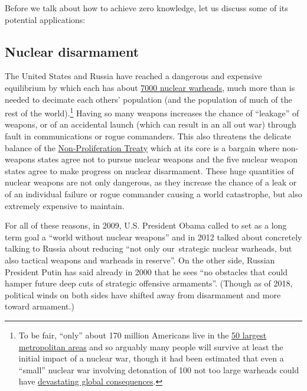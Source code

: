 Before we talk about how to achieve zero knowledge, let us discuss some
of its potential applications:

\subsection{Nuclear disarmament}\label{Nuclear-disarmament}

The United States and Russia have reached a dangerous and expensive
equilibrium by which each has about
\href{https://www.armscontrol.org/factsheets/Nuclearweaponswhohaswhat}{7000
nuclear warheads}, much more than is needed to decimate each others'
population (and the population of much of the rest of the
world).\footnote{To be fair, ``only'' about 170 million Americans live
  in the
  \href{https://www.currentresults.com/Weather-Extremes/US/largest-cities-list.php}{50
  largest metropolitan areas} and so arguably many people will survive
  at least the initial impact of a nuclear war, though it had been
  estimated that even a ``small'' nuclear war involving detonation of
  100 not too large warheads could have
  \href{http://onlinelibrary.wiley.com/doi/10.1002/2013EF000205/full}{devastating
  global consequences}.} Having so many weapons increases the chance of
``leakage'' of weapons, or of an accidental launch (which can result in
an all out war) through fault in communications or rogue commanders.
This also threatens the delicate balance of the
\href{https://en.wikipedia.org/wiki/Treaty_on_the_Non-Proliferation_of_Nuclear_Weapons}{Non-Proliferation
Treaty} which at its core is a bargain where non-weapons states agree
not to pursue nuclear weapons and the five nuclear weapon states agree
to make progress on nuclear disarmament. These huge quantities of
nuclear weapons are not only dangerous, as they increase the chance of a
leak or of an individual failure or rogue commander causing a world
catastrophe, but also extremely expensive to maintain.

For all of these reasons, in 2009, U.S. President Obama called to set as
a long term goal a ``world without nuclear weapons'' and in 2012 talked
about concretely talking to Russia about reducing ``not only
our~strategic nuclear warheads, but also tactical weapons and warheads
in reserve''. On the other side, Russian President Putin has said
already in 2000 that he sees ``no obstacles that could hamper future
deep cuts of strategic offensive armaments''. (Though as of 2018,
political winds on both sides have shifted away from disarmament and
more toward armament.)

